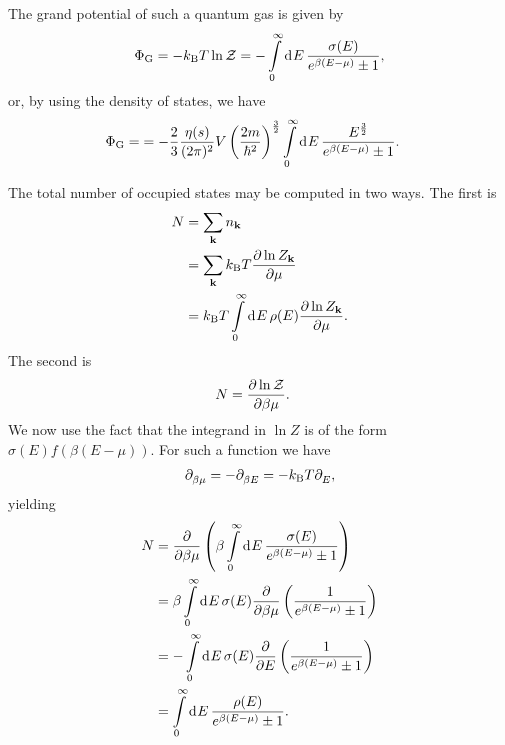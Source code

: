 The grand potential of such a quantum gas is given by
\begin{align*}
	\Phi_{\text{G}} = -k_{\text{B}} T\ln{\mathcal{Z}} = -\int\limits_{0}^{\infty}\dd[]{E}\frac{\sigma(E)}{e^{\beta(E - \mu)} \pm 1},
\end{align*}
or, by using the density of states, we have
\begin{align*}
	\Phi_{\text{G}} = &=  -\frac{2}{3}\frac{\eta(s)}{(2\pi)^{2}}V\left(\frac{2m}{\hbar^{2}}\right)^{\frac{3}{2}}\int\limits_{0}^{\infty}\dd[]{E}\frac{E^{\frac{3}{2}}}{e^{\beta(E - \mu)} \pm 1}.
\end{align*}

The total number of occupied states may be computed in two ways. The first is
\begin{align*}
	N &= \sum\limits_{\vb{k}}n_{\vb{k}} \\
	  &= \sum\limits_{\vb{k}}k_{\text{B}} T\pdv{\ln{Z_{\vb{k}}}}{\mu} \\
	  &= k_{\text{B}} T\int\limits_{0}^{\infty}\dd[]{E}\rho(E)\pdv{\ln{Z_{\vb{k}}}}{\mu}.
\end{align*}
The second is
\begin{align*}
	N &= \pdv{\ln{\mathcal{Z}}}{\beta\mu}.
\end{align*}
We now use the fact that the integrand in $\ln{Z}$ is of the form $\sigma(E)f(\beta(E - \mu))$. For such a function we have
\begin{align*}
	\partial_{\beta\mu}^{} = -\partial_{\beta E}^{} = -k_{\text{B}} T\partial_{E}^{},
\end{align*}
yielding
\begin{align*}
	N &= \pdv{\beta\mu}\left(\beta\int\limits_{0}^{\infty}\dd[]{E}\frac{\sigma(E)}{e^{\beta(E - \mu)} \pm 1}\right) \\
	  &= \beta\int\limits_{0}^{\infty}\dd[]{E}\sigma(E)\pdv{\beta\mu}\left(\frac{1}{e^{\beta(E - \mu)} \pm 1}\right) \\
	  &= -\int\limits_{0}^{\infty}\dd[]{E}\sigma(E)\pdv{E}\left(\frac{1}{e^{\beta(E - \mu)} \pm 1}\right) \\
	  &= \int\limits_{0}^{\infty}\dd[]{E}\frac{\rho(E)}{e^{\beta(E - \mu)} \pm 1}.
\end{align*}

